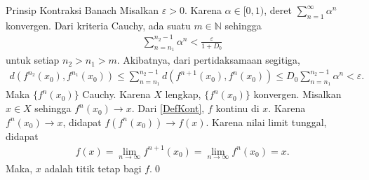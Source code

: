 \documentclass[xcolor={dvipsnames}, 9pt]{beamer}
\begin{document}
	\begin{frame}{Prinsip Kontraksi Banach}
		Misalkan $\varepsilon>0$. Karena $\alpha\in[0,1)$, deret $\sum_{n=1}^{\infty}\alpha^n$ konvergen. Dari kriteria Cauchy, ada suatu $m\in\mathbb{N}$ sehingga
		\begin{align*}
			\sum_{n=n_1}^{n_2-1}\alpha^n < \frac{\varepsilon}{1+D_0}
		\end{align*}
		untuk setiap $n_2>n_1>m$. Akibatnya, dari pertidaksamaan segitiga,
		\begin{align}\label{BCPpro1}
			d(f^{n_2}(x_0),f^{n_1}(x_0))\leq\sum_{n=n_1}^{n_2-1}d(f^{n+1}(x_0),f^n(x_0))\leq D_0\sum_{n=n_1}^{n_2-1}\alpha^n < \varepsilon.
		\end{align}
		Maka $\{f^n(x_0)\}$ Cauchy. Karena $X$ lengkap, $\{f^n(x_0)\}$ konvergen. Misalkan $x\in X$ sehingga $f^n(x_0)\to x$. Dari \eqref{DefKont}, $f$ kontinu di $x$. Karena $f^n(x_0)\to x$, didapat $f(f^n(x_0))\to f(x)$. Karena nilai limit tunggal, didapat
		\begin{align*}
			f(x) = \lim_{n\to\infty}f^{n+1}(x_0) = \lim_{n\to\infty}f^n(x_0) = x.
		\end{align*}
		Maka, $x$ adalah titik tetap bagi $f$.\qed
	\end{frame}
\end{document}
